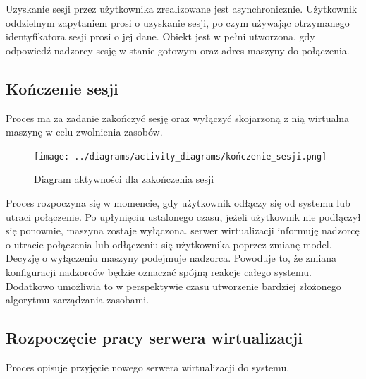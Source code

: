 \documentclass[../opis-rozwiazania.tex]{subfiles}
\begin{document}
Uzyskanie sesji przez użytkownika zrealizowane jest asynchronicznie.
Użytkownik oddzielnym zapytaniem prosi o uzyskanie sesji, po czym używając otrzymanego identyfikatora sesji prosi o jej dane.
Obiekt jest w pełni utworzona, gdy odpowiedź nadzorcy sesję w stanie gotowym oraz adres maszyny do połączenia.

\subsection{Kończenie sesji}

Proces ma za zadanie zakończyć sesję oraz wyłączyć skojarzoną z nią wirtualna maszynę w celu zwolnienia zasobów.

\begin{figure}[H]
    \centering
    \texttt{[image: ../diagrams/activity\_diagrams/kończenie\_sesji.png]}
    \caption{Diagram aktywności dla zakończenia sesji}
    \label{finish_session}
\end{figure}

Proces rozpoczyna się w momencie, gdy użytkownik odłączy się od systemu lub utraci połączenie. Po upłynięciu ustalonego czasu, jeżeli użytkownik nie podłączył się ponownie, maszyna zostaje wyłączona.
serwer wirtualizacji informuję nadzorcę o utracie połączenia lub odłączeniu się użytkownika poprzez zmianę model.
Decyzję o wyłączeniu maszyny podejmuje nadzorca.
Powoduje to, że zmiana konfiguracji nadzorców będzie oznaczać spójną reakcje całego systemu.
Dodatkowo umożliwia to w perspektywie czasu utworzenie bardziej złożonego algorytmu zarządzania zasobami. %

\subsection{Rozpoczęcie pracy serwera wirtualizacji}

Proces opisuje przyjęcie nowego serwera wirtualizacji do systemu.
\end{document}
